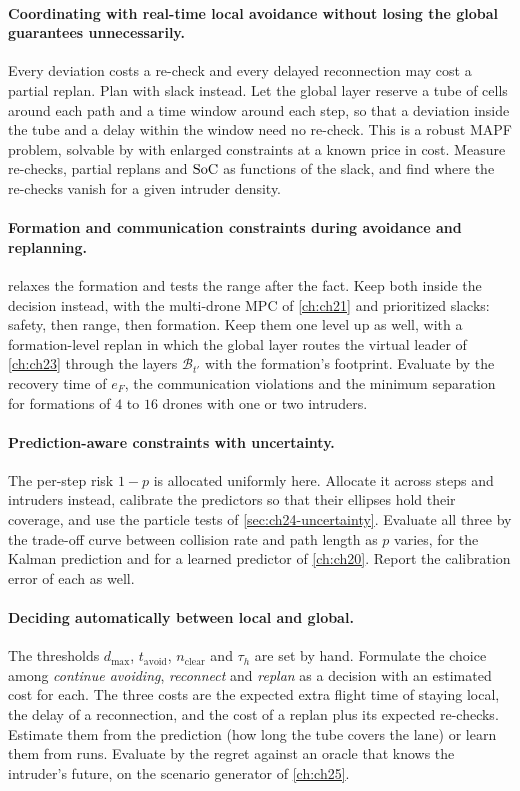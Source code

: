 \paragraph{Coordinating \cbs with real-time local avoidance without losing the global guarantees unnecessarily.}
Every deviation costs a re-check and every delayed reconnection may cost a
partial replan. Plan with slack instead. Let the global layer reserve a
tube of cells around each path and a time window around each step, so that
a deviation inside the tube and a delay within the window need no re-check.
This is a robust MAPF problem, solvable by \cbs with enlarged constraints at
a known price in cost. Measure re-checks, partial replans and $\mathrm{SoC}$ as
functions of the slack, and find where the re-checks vanish for a given
intruder density.

\paragraph{Formation and communication constraints during avoidance and replanning.}
 relaxes the formation and tests the range after
the fact. Keep both inside the decision instead, with the multi-drone MPC of
\cref{ch:ch21} and prioritized slacks: safety, then range, then formation.
Keep them one level up as well, with a formation-level replan in which the
global layer routes the virtual leader of \cref{ch:ch23} through the layers
$\mathcal{B}_{t'}$ with the formation's footprint. Evaluate by the recovery
time of $e_F$, the communication violations and the minimum separation for
formations of $4$ to $16$ drones with one or two intruders.

\paragraph{Prediction-aware constraints with uncertainty.}
The per-step risk $1 - p$ is allocated uniformly here. Allocate it across
steps and intruders instead, calibrate the predictors so that their
ellipses hold their coverage, and use the particle tests of
\cref{sec:ch24-uncertainty}. Evaluate all three by the trade-off curve
between collision rate and path length as $p$ varies, for the Kalman
prediction and for a learned predictor of \cref{ch:ch20}. Report the
calibration error of each as well.

\paragraph{Deciding automatically between local and global.}
The thresholds $d_{\max}$, $t_{\mathrm{avoid}}$, $n_{\mathrm{clear}}$ and
$\tau_h$ are set by hand. Formulate the choice among \emph{continue
avoiding}, \emph{reconnect} and \emph{replan} as a decision with an
estimated cost for each. The three costs are the expected extra flight time
of staying local, the delay of a reconnection, and the cost of a replan plus
its expected re-checks. Estimate them from the prediction (how long the tube
covers the lane) or learn them from runs. Evaluate by the regret against an oracle that knows
the intruder's future, on the scenario generator of \cref{ch:ch25}.

